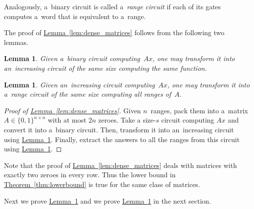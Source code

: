 \documentclass[11pt]{article}
\numberwithin{equation}{section}
\newtheorem{lemma}[theorem]{Lemma}
\theoremstyle{definition}
\theoremstyle{plain}
\newcommand{\expref}[2]{\hyperref[#2]{#1~\ref{#2}}}
\theoremstyle{plain}\newtheorem{observation}[theorem]{Observation}
\begin{document}
Analogously, a~binary circuit is called a~\emph{range circuit} if each of its gates computes a~word that is equivalent to a~range.

The proof of \expref{Lemma}{lem:dense_matrices} follows from the following two lemmas.

\begin{lemma}\label{lemma:correctorder}
    Given a~binary circuit computing~$Ax$, one may transform it into an~increasing circuit of the same size computing the same function.
\end{lemma}

\begin{lemma}\label{lemma:matrixranges}
    Given an~increasing circuit computing~$Ax$, one may transform it into a~range circuit of the same size computing all ranges of~$A$.
\end{lemma}

\begin{proof}[Proof of {\expref{Lemma}{lem:dense_matrices}}]
    Given $n$~ranges, pack them into a~matrix $A \in \{0,1\}^{n \times n}$ with at most $2n$ zeroes. Take a size-$s$ circuit computing $Ax$ and convert it into a~binary circuit. Then, transform it into an~increasing circuit using \expref{Lemma}{lemma:correctorder}. Finally, extract the answers to all the ranges from this circuit using \expref{Lemma}{lemma:matrixranges}.
\end{proof}

Note that the proof of \expref{Lemma}{lem:dense_matrices} deals with matrices with exactly two zeroes in every row. Thus the lower bound in \expref{Theorem}{thm:lowerbound} is true for the same class of matrices.
%
%
%

Next we prove \expref{Lemma}{lemma:matrixranges} and we prove \expref{Lemma}{lemma:correctorder} in the next section.
\end{document}
